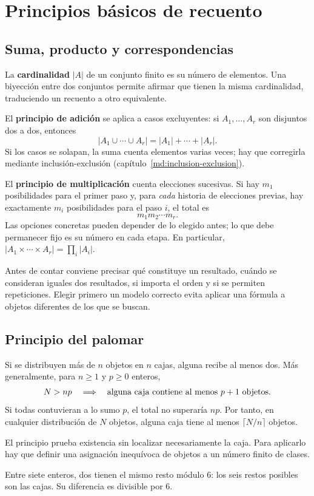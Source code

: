 \chapter{Principios básicos de recuento}
\label{md:recuento}

\section{Suma, producto y correspondencias}

La \textbf{cardinalidad} $|A|$ de un conjunto finito es su número
de elementos. Una biyección entre dos conjuntos permite afirmar
que tienen la misma cardinalidad, traduciendo un recuento a otro
equivalente.

El \textbf{principio de adición} se aplica a casos excluyentes:
si $A_1,\ldots,A_r$ son disjuntos dos a dos, entonces
\[
 |A_1\cup\cdots\cup A_r|=|A_1|+\cdots+|A_r|.
\]
Si los casos se solapan, la suma cuenta elementos varias veces;
hay que corregirla mediante inclusión-exclusión
(capítulo~\ref{md:inclusion-exclusion}).

El \textbf{principio de multiplicación} cuenta elecciones sucesivas.
Si hay $m_1$ posibilidades para el primer paso y, para \emph{cada}
historia de elecciones previas, hay exactamente $m_i$ posibilidades
para el paso $i$, el total es
\[
 m_1m_2\cdots m_r.
\]
Las opciones concretas pueden depender de lo elegido antes;
lo que debe permanecer fijo es su número en cada etapa.
En particular, $|A_1\times\cdots\times A_r|=\prod_i|A_i|$.

Antes de contar conviene precisar qué constituye un resultado,
cuándo se consideran iguales dos resultados, si importa el orden
y si se permiten repeticiones. Elegir primero un modelo correcto
evita aplicar una fórmula a objetos diferentes de los que se buscan.

\section{Principio del palomar}
\label{md:palomar}

Si se distribuyen más de $n$ objetos en $n$ cajas, alguna recibe
al menos dos. Más generalmente, para $n\ge1$ y $p\ge0$ enteros,
\[
 N>np\quad\Longrightarrow\quad
 \text{alguna caja contiene al menos }p+1\text{ objetos}.
\]
Si todas contuvieran a lo sumo $p$, el total no superaría $np$.
Por tanto, en cualquier distribución de $N$ objetos, alguna caja
tiene al menos $\lceil N/n\rceil$ objetos.

El principio prueba existencia sin localizar necesariamente la caja.
Para aplicarlo hay que definir una asignación inequívoca de objetos
a un número finito de clases.

\begin{ejemplo}
Entre siete enteros, dos tienen el mismo resto módulo $6$:
los seis restos posibles son las cajas. Su diferencia es divisible por $6$.
\end{ejemplo}
